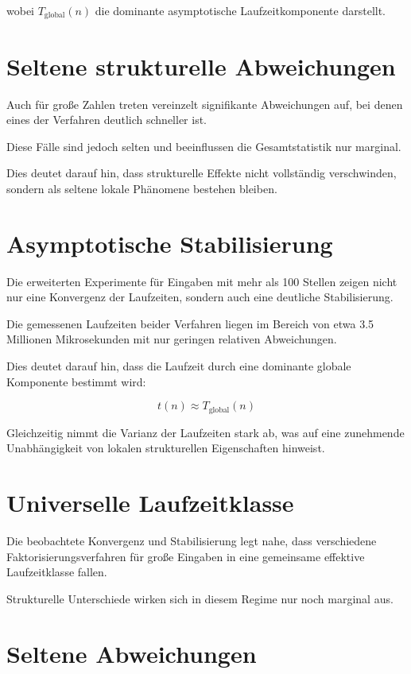 \documentclass[11pt,a4paper]{article}
\begin{document}
	wobei $T_{\text{global}}(n)$ die dominante asymptotische Laufzeitkomponente darstellt.
	
	\section{Seltene strukturelle Abweichungen}
	
	Auch für große Zahlen treten vereinzelt signifikante Abweichungen auf, bei denen eines der Verfahren deutlich schneller ist.
	
	Diese Fälle sind jedoch selten und beeinflussen die Gesamtstatistik nur marginal.
	
	Dies deutet darauf hin, dass strukturelle Effekte nicht vollständig verschwinden, sondern als seltene lokale Phänomene bestehen bleiben.
	
	\section{Asymptotische Stabilisierung}
	
	Die erweiterten Experimente für Eingaben mit mehr als 100 Stellen zeigen nicht nur eine Konvergenz der Laufzeiten, sondern auch eine deutliche Stabilisierung.
	
	Die gemessenen Laufzeiten beider Verfahren liegen im Bereich von etwa 3.5 Millionen Mikrosekunden mit nur geringen relativen Abweichungen.
	
	Dies deutet darauf hin, dass die Laufzeit durch eine dominante globale Komponente bestimmt wird:
	
	\begin{equation}
		t(n) \approx T_{\text{global}}(n)
	\end{equation}
	
	Gleichzeitig nimmt die Varianz der Laufzeiten stark ab, was auf eine zunehmende Unabhängigkeit von lokalen strukturellen Eigenschaften hinweist.
	
	\section{Universelle Laufzeitklasse}
	
	Die beobachtete Konvergenz und Stabilisierung legt nahe, dass verschiedene Faktorisierungsverfahren für große Eingaben in eine gemeinsame effektive Laufzeitklasse fallen.
	
	Strukturelle Unterschiede wirken sich in diesem Regime nur noch marginal aus.
	
	\section{Seltene Abweichungen}
	
\end{document}
